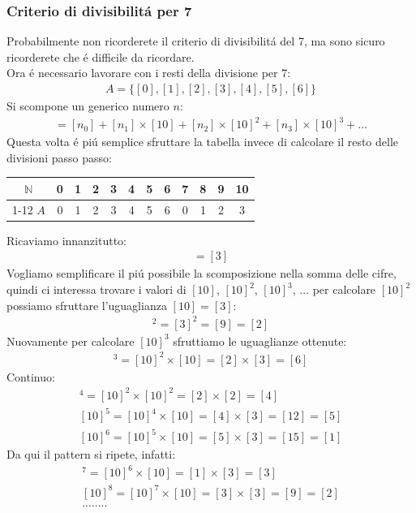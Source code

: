 \documentclass[twoside]{article} %
\begin{document}
	\subsubsection{Criterio di divisibilit\'a per 7}
	Probabilmente non ricorderete il criterio di divisibilit\'a del 7, ma sono sicuro ricorderete che \'e difficile da ricordare.\\
	Ora \'e necessario lavorare con i resti della divisione per 7:
	\begin{gather*}
		A=\{[0],[1],[2],[3],[4],[5],[6]\}
	\end{gather*}
	Si scompone un generico numero $n$:
	\begin{align*}
		[n]=[n_0]+[n_1]\times [10]+[n_2]\times [10]^2+[n_3]\times [10]^3+...
	\end{align*}
	Questa volta \'e pi\'u semplice sfruttare la tabella invece di calcolare il resto delle divisioni passo passo:
	\begin{center}
	 	\begin{tabular}{c|c|c|c|c|c|c|c|c|c|c|c}
	 		$\mathbb{N}$&0&1&2&3&4&5&6&7&8&9&10\\\cline{1-12}
	 		$A$&0&1&2&3&4&5&6&0&1&2&3
	 	\end{tabular}
	 \end{center}
	Ricaviamo innanzitutto:
	\begin{gather*}
		[10]=[3]
	\end{gather*}
	Vogliamo semplificare il pi\'u possibile la scomposizione nella somma delle cifre, quindi ci interessa trovare i valori di $[10]$, $[10]^2$, $[10]^3$, ... per calcolare $[10]^2$ possiamo sfruttare l'uguaglianza $[10]=[3]$:
	\begin{gather*}
		[10]^2=[3]^2=[9]=[2]
	\end{gather*}
	Nuovamente per calcolare $[10]^3$ sfruttiamo le uguaglianze ottenute:
	\begin{gather*}
		[10]^3=[10]^2\times [10]=[2]\times [3]=[6]
	\end{gather*}
	Continuo:
	\begin{gather*}
		[10]^4=[10]^2\times [10]^2=[2]\times [2]=[4]\\
		[10]^5=[10]^4\times [10]=[4]\times [3]=[12]=[5]\\
		[10]^6=[10]^5\times [10]=[5]\times [3]=[15]=[1]
	\end{gather*}	
	Da qui il pattern si ripete, infatti:
	\begin{gather*}
		[10]^7=[10]^6\times [10]=[1]\times [3]=[3]\\
		[10]^8=[10]^7\times [10]=[3]\times [3]=[9]=[2]\\
		........
	\end{gather*}
\end{document}
